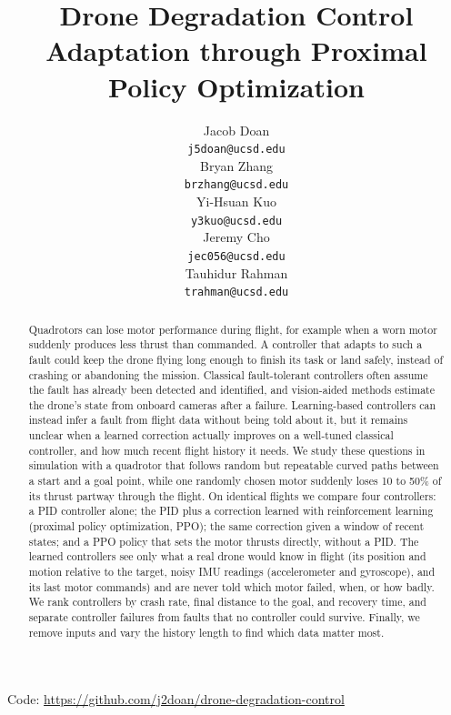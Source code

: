 \documentclass[12pt,letterpaper]{article}
\title{Drone Degradation Control Adaptation through Proximal Policy Optimization}
\author{Jacob Doan \\
  {\tt j5doan@ucsd.edu} \\\And
  Bryan Zhang \\
  {\tt brzhang@ucsd.edu} \\\And
  Yi-Hsuan Kuo \\
  {\tt y3kuo@ucsd.edu} \\\And
  Jeremy Cho \\
  {\tt jec056@ucsd.edu} \\\And
  Tauhidur Rahman \\
  {\tt trahman@ucsd.edu} \\}
\begin{document}
\maketitle


\begin{abstract}
    Quadrotors can lose motor performance during flight, for example when a worn motor suddenly produces less thrust than commanded. A controller that adapts to such a fault could keep the drone flying long enough to finish its task or land safely, instead of crashing or abandoning the mission. Classical fault-tolerant controllers often assume the fault has already been detected and identified, and vision-aided methods estimate the drone's state from onboard cameras after a failure. Learning-based controllers can instead infer a fault from flight data without being told about it, but it remains unclear when a learned correction actually improves on a well-tuned classical controller, and how much recent flight history it needs. We study these questions in simulation with a quadrotor that follows random but repeatable curved paths between a start and a goal point, while one randomly chosen motor suddenly loses 10 to 50\% of its thrust partway through the flight. On identical flights we compare four controllers: a PID controller alone; the PID plus a correction learned with reinforcement learning (proximal policy optimization, PPO); the same correction given a window of recent states; and a PPO policy that sets the motor thrusts directly, without a PID. The learned controllers see only what a real drone would know in flight (its position and motion relative to the target, noisy IMU readings (accelerometer and gyroscope), and its last motor commands) and are never told which motor failed, when, or how badly. We rank controllers by crash rate, final distance to the goal, and recovery time, and separate controller failures from faults that no controller could survive. Finally, we remove inputs and vary the history length to find which data matter most.
\end{abstract}

\begin{center}
Code: \url{https://github.com/j2doan/drone-degradation-control}
\clearpage
\end{center}

\maketoc
\clearpage
\end{document}
